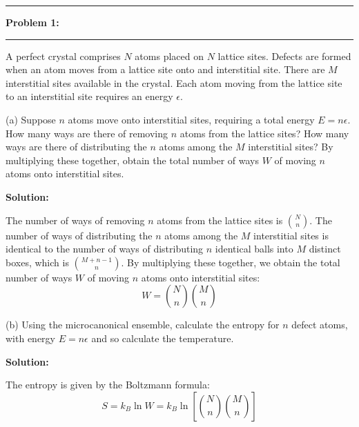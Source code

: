 \documentclass[11pt]{article}
\newcommand\question[2]{\vspace{.25in}\hrule\textbf{#1: #2}\vspace{.5em}\hrule\vspace{.10in}}
\begin{document}
\raggedright
\newcommand\NAME{Shi You}  %
\newcommand\ANDREWID{0xfffff}     %
\newcommand\HWNUM{2}              %

\newcommand{\sumn}{\sum_{n=0}^{\infty}}
\newcommand{\ea}{e^{\alpha}}
\newcommand{\nea}{e^{-\alpha}}
\newcommand{\expo}{\left(-\beta n\epsilon\right)}
\newcommand{\dif}{\mathrm{d}}
\newcommand{\solution}{\textbf{Solution:}}

\question{Problem 1}{}
A perfect crystal comprises $N$ atoms placed on $N$ lattice sites. Defects are formed when an 
atom moves from a lattice site onto and interstitial site. There are $M$ interstitial sites available in the crystal.
Each atom moving from the lattice site to an interstitial site requires an energy $\epsilon$.

(a) Suppose $n$ atoms move onto interstitial sites, requiring a total energy $E=n\epsilon$.
How many ways are there of removing $n$ atoms from the lattice sites? How many ways are there of distributing the $n$ atoms among the $M$ interstitial sites?
By multiplying these together, obtain the total number of ways $W$ of moving $n$ atoms onto interstitial sites.

\solution

The number of ways of removing $n$ atoms from the lattice sites is $N\choose n$.
The number of ways of distributing the $n$ atoms among the $M$ interstitial sites is identical to the number of ways of distributing $n$ identical balls into $M$ distinct boxes, which is $M+n-1\choose n$.
By multiplying these together, we obtain the total number of ways $W$ of moving $n$ atoms onto interstitial sites:
\begin{equation}
    W={N\choose n}{M\choose n}
\end{equation}

(b) Using the microcanonical ensemble, calculate the entropy for $n$ defect atoms, with energy $E=n\epsilon$ and so calculate the temperature.

\solution

The entropy is given by the Boltzmann formula: 
\begin{equation}
    S=k_B\ln W=k_B\ln\left[{N\choose n}{M\choose n}\right]
\end{equation}
\end{document}
